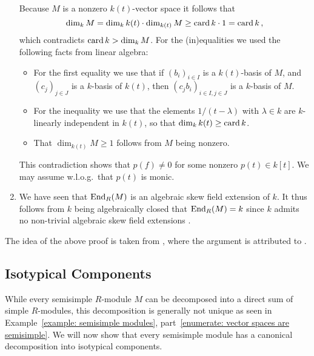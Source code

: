 \begin{remark}
\begin{enumerate}[label=\arabic*)]
      Because $M$ is a nonzero $k(t)$-vector space it follows that
      \[
              \dim_k M
        =     \dim_k k(t) \cdot \dim_{k(t)} M
        \geq  \operatorname{card} k \cdot 1
        =     \operatorname{card} k \,,
      \]
      which contradicts $\operatorname{card} k > \dim_k M$.
      For the (in)equalities we used the following facts from linear algebra:
      \begin{itemize}
        \item
          For the first equality we use that if $(b_i)_{i \in I}$ is a $k(t)$-basis of $M$, and $(c_j)_{j \in J}$ is a $k$-basis of $k(t)$, then $(c_j b_i)_{i \in I, j \in J}$ is a $k$-basis of $M$.
        \item
          For the inequality we use that the elements $1/(t-\lambda)$ with $\lambda \in k$ are $k$-linearly independent in $k(t)$, so that $\dim_k k(t) \geq \operatorname{card} k$.
        \item
          That $\dim_{k(t)} M \geq 1$ follows from $M$ being nonzero.
      \end{itemize}
      This contradiction shows that $p(f) \neq 0$ for some nonzero $p(t) \in k[t]$.
      We may assume w.l.o.g.\ that $p(t)$ is monic.
      
    \item
      We have seen that $\operatorname{End}_R(M)$ is an algebraic skew field extension of $k$.
      It thus follows from $k$ being algebraically closed that $\operatorname{End}_R(M) = k$ since $k$ admits no non-trivial algebraic skew field extensions
      .
  \end{enumerate}
  The idea of the above proof is taken from \cite{Quillen}, where the argument is attributed to \cite{Dixmier}.
\end{remark}





\subsection{Isotypical Components}


\begin{fluff}
  While every semisimple $R$-module $M$ can be decomposed into a direct sum of simple $R$-modules, this decomposition is generally not unique as seen in Example~\ref{example: semisimple modules}, part~\ref*{enumerate: vector spaces are semisimple}.
  We will now show that every semisimple module has a canonical decomposition into isotypical components.
\end{fluff}


